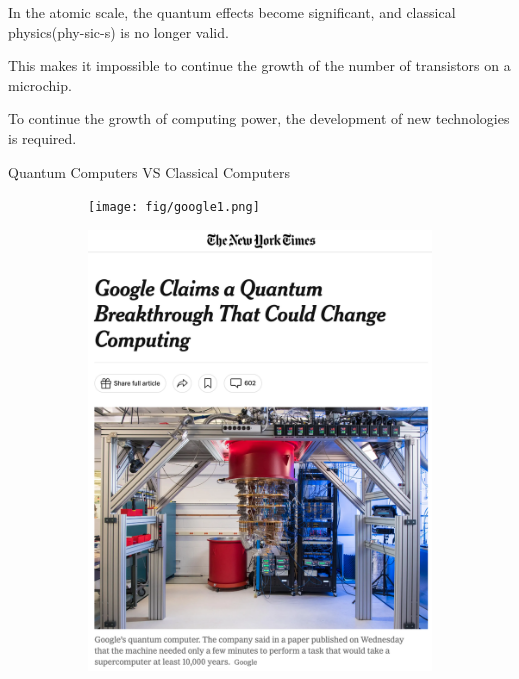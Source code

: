 \documentclass[10pt]{beamer}
\begin{document}
\begin{CJK}{UTF8}{gbsn}
{In the atomic scale, the quantum effects become significant, and classical physics(phy-sic-s) is no longer valid.

This makes it impossible to continue the growth of the number of transistors on a microchip.

To continue the growth of computing power, the development of new technologies is required.


}


\begin{frame}[fragile]{Quantum Computers VS Classical Computers}
\begin{figure}
  \centering
  \begin{subfigure}[b]{0.2\textwidth}
    \texttt{[image: fig/google1.png]}
  \end{subfigure}
  \hfill
  \begin{subfigure}[b]{0.3\textwidth}
    \includegraphics[width=\textwidth]{fig/newyorktimes.png}

\end{subfigure}
\end{figure}
\end{frame}
\end{CJK}
\end{document}

